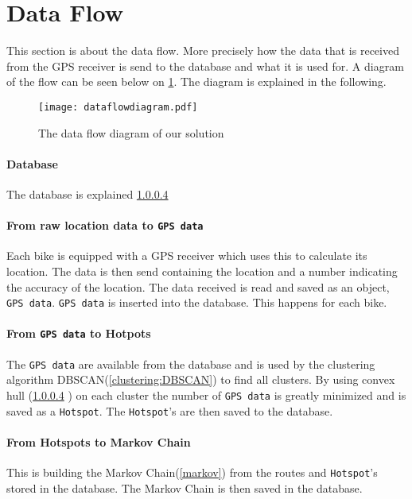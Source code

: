 \section{Data Flow}
This section is about the data flow. More precisely how the data that is received from the GPS receiver is send to the database and what it is used for.
A diagram of the flow can be seen below on \cref{fig:dataFlowDiagram}.
The diagram is explained in the following.

\begin{figure}[H]
\texttt{[image: dataflowdiagram.pdf]}
\caption{The data flow diagram of our solution}
\label{fig:dataFlowDiagram}
\end{figure}
\pagebreak 

\paragraph{Database}
The database is explained \cref{} 

\paragraph{From raw location data to \texttt{GPS data}}
Each bike is equipped with a GPS receiver which uses this to calculate its location.
The data is then send containing the location and a number indicating the accuracy of the location.
The data received is read and saved as an object, \texttt{GPS data}.
\texttt{GPS data} is inserted into the database.
This happens for each bike.

\paragraph{From \texttt{GPS data} to Hotpots}
The \texttt{GPS data} are available from the database and is used by the clustering algorithm DBSCAN(\cref{clustering:DBSCAN}) to find all clusters.
By using convex hull (\cref{} ) on each cluster the number of \texttt{GPS data} is greatly minimized and is saved as a \texttt{Hotspot}.
The \texttt{Hotspot}'s are then saved to the database.

\paragraph{From Hotspots to Markov Chain}
This is building the Markov Chain(\cref{markov}) from the routes and \texttt{Hotspot}'s stored in the database.
The Markov Chain is then saved in the database.